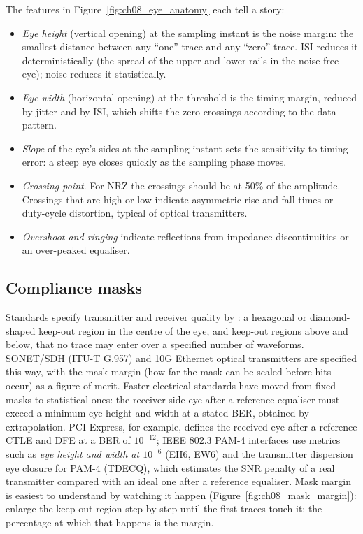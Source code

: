 The features in Figure~\ref{fig:ch08_eye_anatomy} each tell a story:
\begin{itemize}
\item \emph{Eye height} (vertical opening) at the sampling instant is the noise margin: the
smallest distance between any ``one'' trace and any ``zero'' trace. ISI reduces it
deterministically (the spread of the upper and lower rails in the noise-free eye); noise
reduces it statistically.
\item \emph{Eye width} (horizontal opening) at the threshold is the timing margin, reduced by
jitter and by ISI, which shifts the zero crossings according to the data pattern.
\item \emph{Slope} of the eye's sides at the sampling instant sets the sensitivity to timing
error: a steep eye closes quickly as the sampling phase moves.
\item \emph{Crossing point}. For NRZ the crossings should be at 50\% of the amplitude. Crossings
that are high or low indicate asymmetric rise and fall times or duty-cycle distortion, typical
of optical transmitters.
\item \emph{Overshoot and ringing} indicate reflections from impedance discontinuities or an
over-peaked equaliser.
\end{itemize}

\subsection{Compliance masks}

Standards specify transmitter and receiver quality by : a hexagonal or
diamond-shaped keep-out region in the centre of the eye, and keep-out regions above and below,
that no trace may enter over a specified number of waveforms. SONET/SDH (ITU-T G.957) and
10G Ethernet optical transmitters are specified this way, with the mask margin (how far the
mask can be scaled before hits occur) as a figure of merit. Faster electrical standards have
moved from fixed masks to statistical ones: the receiver-side eye after a reference equaliser
must exceed a minimum eye height and width at a stated BER, obtained by extrapolation. PCI
Express, for example, defines the received eye after a reference CTLE and DFE at a BER of
$10^{-12}$; IEEE 802.3 PAM-4 interfaces use metrics such as \emph{eye height and width at
$10^{-6}$} (EH6, EW6) and the transmitter dispersion eye closure for PAM-4 (TDECQ), which
estimates the SNR penalty of a real transmitter compared with an ideal one after a reference
equaliser. Mask margin is easiest to understand by watching it happen
(Figure~\ref{fig:ch08_mask_margin}): enlarge the keep-out region step by step until the first
traces touch it; the percentage at which that happens is the margin.

